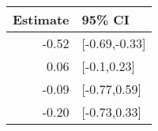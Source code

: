 \begin{tabular}{rl}
  \hline
Estimate & 95\% CI \\ 
  \hline
-0.52 & [-0.69,-0.33] \\ 
  0.06 & [-0.1,0.23] \\ 
  -0.09 & [-0.77,0.59] \\ 
  -0.20 & [-0.73,0.33] \\ 
   \hline
\end{tabular}

